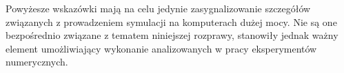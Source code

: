 Powyżesze wskazówki mają na celu jedynie zasygnalizowanie szczegółów związanych z prowadzeniem symulacji na komputerach dużej mocy. Nie są one bezpośrednio związane z tematem niniejszej rozprawy, stanowiły jednak ważny element umożliwiający wykonanie analizowanych w pracy eksperymentów numerycznych.
